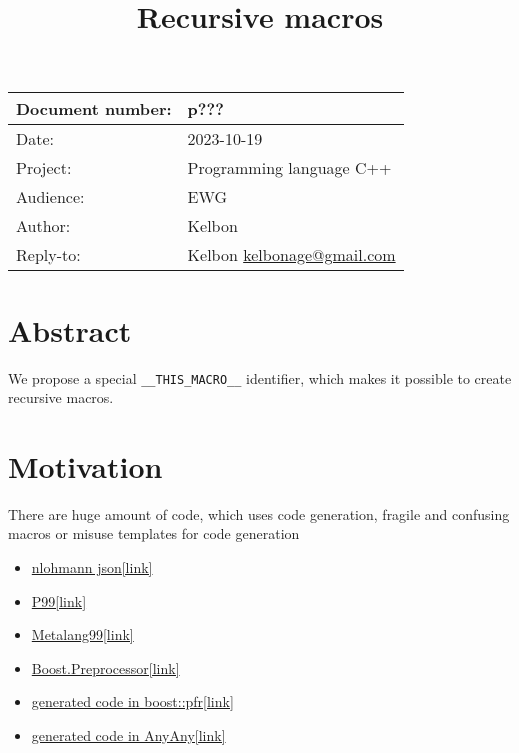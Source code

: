 \documentclass[12pt]{article}
\title{Recursive macros}
\date{}
\author{}
\begin{document}

\maketitle

\begin{FlushLeft}

\begin{tabular}{|l|l|}
\hline
 Document number: & p??? \\ \hline
 Date: & 2023-10-19  \\ \hline
 Project: & Programming language C++ \\ \hline
 Audience: & EWG \\ \hline
 Author: & Kelbon \\ \hline
 Reply-to: & Kelbon \href{mailto:kelbonage@gmail.com}{kelbonage@gmail.com} \\ \hline
\hline
\end{tabular}

\end{FlushLeft}

\newpage

\tableofcontents
\newpage

\section{Abstract}
We propose a special \lstinline{__THIS_MACRO__} identifier, which makes it possible to create recursive macros.

\section{Motivation}
 There are huge amount of code, which uses code generation, fragile and confusing macros
  or misuse templates for code generation
\begin{itemize}
  \item \href{https://github.com/nlohmann/json/blob/836b7beca4b62e2a99465edef44066b7401fd704/include/nlohmann/detail/macro_scope.hpp#L320}{nlohmann json[link]}
  \item \href{https://github.com/133794m3r/c-library/blob/master/p99/p99_generated.h}{P99[link]}
  \item \href{https://github.com/Hirrolot/metalang99/blob/695a9d8dbc3507447ba28d312da229730d20c6fc/include/metalang99/eval/rec.h#L12}{Metalang99[link]}
  \item \href{https://github.com/boostorg/preprocessor/blob/develop/include/boost/preprocessor/seq/fold_left.hpp}{Boost.Preprocessor[link]}
  \item \href{https://github.com/boostorg/pfr/blob/develop/include/boost/pfr/detail/core17_generated.hpp}{generated code in boost::pfr[link]}
  \item \href{https://github.com/kelbon/AnyAny/blob/4b056be2b6cbcfa1a407f7ee75279af414e390e4/include/anyany/noexport/data_parallel_vector_details.hpp#L62}{generated code in AnyAny[link]}
\end{itemize}
\end{document}
